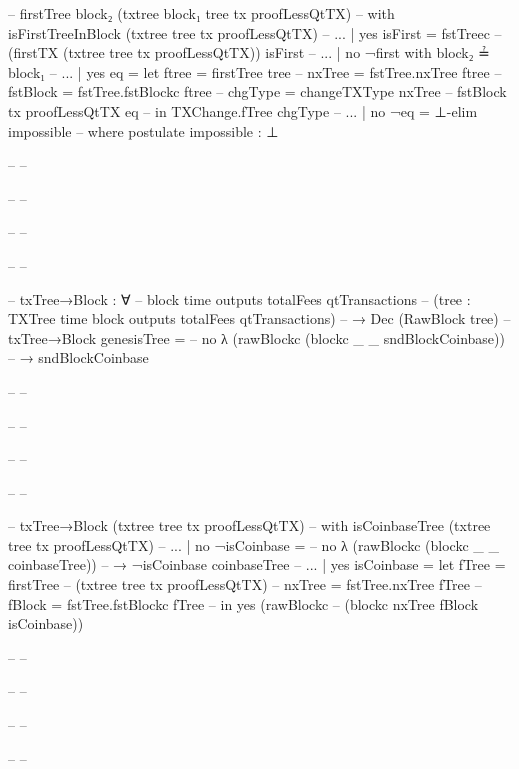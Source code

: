 \documentclass{beamer}
\begin{document}
{\begin{frame}
\begin{code}
--       firstTree {block₂} (txtree {block₁} tree tx proofLessQtTX)
--         with isFirstTreeInBlock (txtree tree tx proofLessQtTX)
--       ... | yes isFirst = fstTreec
--         (firstTX (txtree tree tx proofLessQtTX)) isFirst
--       ... | no ¬first with block₂ ≟ block₁
--       ...   | yes eq = let ftree = firstTree tree
--                            nxTree = fstTree.nxTree ftree
--                            fstBlock = fstTree.fstBlockc ftree
--                            chgType = changeTXType nxTree
--                              fstBlock tx proofLessQtTX eq
--                        in TXChange.fTree chgType
--       ...   | no ¬eq = ⊥-elim impossible
--                 where postulate impossible : ⊥

-- -- \end{code}
-- -- \end{frame}
-- -- \begin{frame}
-- -- \begin{code}

--       txTree→Block : ∀
--         {block time outputs totalFees qtTransactions}
--         (tree : TXTree time block outputs totalFees qtTransactions)
--         → Dec (RawBlock tree)
--       txTree→Block genesisTree =
--         no λ { (rawBlockc (blockc _ _ sndBlockCoinbase))
--         → sndBlockCoinbase }

-- -- \end{code}
-- -- \end{frame}
-- -- \begin{frame}
-- -- \begin{code}

--       txTree→Block (txtree tree tx proofLessQtTX)
--         with isCoinbaseTree (txtree tree tx proofLessQtTX)
--       ... | no ¬isCoinbase =
--               no λ{ (rawBlockc (blockc _ _ coinbaseTree))
--                 → ¬isCoinbase coinbaseTree}
--       ... | yes isCoinbase = let fTree = firstTree
--                                    (txtree tree tx proofLessQtTX)
--                                  nxTree = fstTree.nxTree fTree
--                                  fBlock = fstTree.fstBlockc fTree
--                              in yes (rawBlockc
--                                (blockc nxTree fBlock isCoinbase))

-- -- \end{code}
-- -- \end{frame}
-- -- \begin{frame}
-- -- \begin{code}


\end{code}
\end{frame}}
\end{document}
